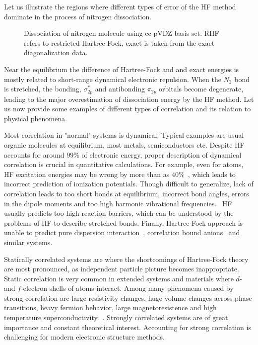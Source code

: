 Let us illustrate the regions where different types of error of the HF method 
dominate in the process of nitrogen dissociation. 
%
\begin{figure}[tb]
\caption{Dissociation of nitrogen molecule using cc-pVDZ basis set. RHF refers 
to restricted Hartree-Fock, exact is taken from the exact diagonalization data.
\label{fig:n2_hf_exact}}
\end{figure}
%
Near the equilibrium the difference of Hartree-Fock and and exact energies is 
mostly related to short-range dynamical electronic repulsion. When the $N_2$ 
bond is stretched, the bonding, $\sigma^{\ast}_{2p}$ and antibonding $\pi_{2p}$ 
orbitals become degenerate, leading to the major overestimation of 
dissociation energy by the HF method. Let us now provide some examples of 
different types of correlation and its relation to physical phenomena.

Most correlation in "normal" systems is dynamical. Typical examples 
are usual organic molecules at equilibrium, most metals, semiconductors 
etc. Despite HF accounts for around $99\%$ of electronic energy, proper 
description of dynamical correlation is crucial in quantitative calculations.
For example, even for atoms, HF excitation energies may be wrong by 
more than as $40\%$~\cite{irek_9}, which leads to incorrect prediction of 
ionization potentials. Though difficult to generalize, lack of 
correlation leads to too short bonds at equilibrium, incorrect bond angles, 
errors in the dipole moments and too high harmonic vibrational 
frequencies.~\cite{irek_11, irek_12} HF usually predicts too high reaction 
barriers, which can be understood by the problems of HF to describe stretched 
bonds. Finally, Hartree-Fock approach is unable to predict pure 
dispersion interaction~\cite{irek_13}, correlation bound anions~\cite{irek_14} 
and similar systems.  

Statically correlated systems are where the shortcomings of Hartree-Fock theory 
are most pronounced, as independent particle picture becomes inappropriate. 
Static correlation is very common in extended systems and materials 
where $d$- and $f$-electron shells of atoms interact. Among many phenomena 
caused by strong correlation are large resistivity changes, huge volume changes 
across phase transitions, heavy fermion behavior, large 
magnetoresistence and high temperature superconductivity.~\cite{irek_15, 
irek_16}. Strongly correlated systems are of great importance and constant 
theoretical interest. Accounting for strong correlation is challenging for 
modern electronic structure methods.
 
